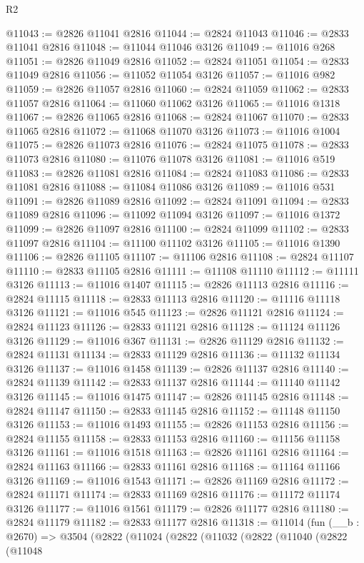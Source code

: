 \begin{lexlean}{R2}
\begin{coremodule}
@11043 := @2826 @11041 @2816
@11044 := @2824 @11043
@11046 := @2833 @11041 @2816
@11048 := @11044 @11046 @3126
@11049 := @11016 @268
@11051 := @2826 @11049 @2816
@11052 := @2824 @11051
@11054 := @2833 @11049 @2816
@11056 := @11052 @11054 @3126
@11057 := @11016 @982
@11059 := @2826 @11057 @2816
@11060 := @2824 @11059
@11062 := @2833 @11057 @2816
@11064 := @11060 @11062 @3126
@11065 := @11016 @1318
@11067 := @2826 @11065 @2816
@11068 := @2824 @11067
@11070 := @2833 @11065 @2816
@11072 := @11068 @11070 @3126
@11073 := @11016 @1004
@11075 := @2826 @11073 @2816
@11076 := @2824 @11075
@11078 := @2833 @11073 @2816
@11080 := @11076 @11078 @3126
@11081 := @11016 @519
@11083 := @2826 @11081 @2816
@11084 := @2824 @11083
@11086 := @2833 @11081 @2816
@11088 := @11084 @11086 @3126
@11089 := @11016 @531
@11091 := @2826 @11089 @2816
@11092 := @2824 @11091
@11094 := @2833 @11089 @2816
@11096 := @11092 @11094 @3126
@11097 := @11016 @1372
@11099 := @2826 @11097 @2816
@11100 := @2824 @11099
@11102 := @2833 @11097 @2816
@11104 := @11100 @11102 @3126
@11105 := @11016 @1390
@11106 := @2826 @11105
@11107 := @11106 @2816
@11108 := @2824 @11107
@11110 := @2833 @11105 @2816
@11111 := @11108 @11110
@11112 := @11111 @3126
@11113 := @11016 @1407
@11115 := @2826 @11113 @2816
@11116 := @2824 @11115
@11118 := @2833 @11113 @2816
@11120 := @11116 @11118 @3126
@11121 := @11016 @545
@11123 := @2826 @11121 @2816
@11124 := @2824 @11123
@11126 := @2833 @11121 @2816
@11128 := @11124 @11126 @3126
@11129 := @11016 @367
@11131 := @2826 @11129 @2816
@11132 := @2824 @11131
@11134 := @2833 @11129 @2816
@11136 := @11132 @11134 @3126
@11137 := @11016 @1458
@11139 := @2826 @11137 @2816
@11140 := @2824 @11139
@11142 := @2833 @11137 @2816
@11144 := @11140 @11142 @3126
@11145 := @11016 @1475
@11147 := @2826 @11145 @2816
@11148 := @2824 @11147
@11150 := @2833 @11145 @2816
@11152 := @11148 @11150 @3126
@11153 := @11016 @1493
@11155 := @2826 @11153 @2816
@11156 := @2824 @11155
@11158 := @2833 @11153 @2816
@11160 := @11156 @11158 @3126
@11161 := @11016 @1518
@11163 := @2826 @11161 @2816
@11164 := @2824 @11163
@11166 := @2833 @11161 @2816
@11168 := @11164 @11166 @3126
@11169 := @11016 @1543
@11171 := @2826 @11169 @2816
@11172 := @2824 @11171
@11174 := @2833 @11169 @2816
@11176 := @11172 @11174 @3126
@11177 := @11016 @1561
@11179 := @2826 @11177 @2816
@11180 := @2824 @11179
@11182 := @2833 @11177 @2816
@11318 := @11014
    (fun (__b : @2670) =>
    @3504
      (@2822
        (@11024
          (@2822
            (@11032
              (@2822
                (@11040
                  (@2822
                    (@11048

\end{coremodule}
\end{lexlean}
